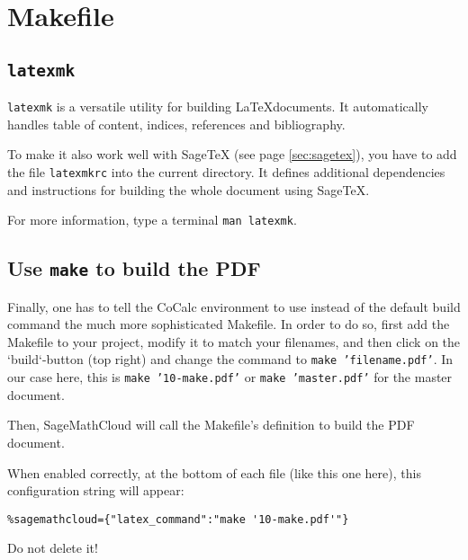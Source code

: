 \documentclass[master.tex]{subfiles}
\begin{document}
\chapter{Makefile}

\section{\texttt{latexmk}}

\texttt{latexmk} is a versatile utility for building \LaTeX documents.
It automatically handles table of content, indices,
references and bibliography.

To make it also work well with SageTeX (see page \ref{sec:sagetex}),
you have to add the file \texttt{latexmkrc}
into the current directory.
It defines additional dependencies and instructions for
building the whole document using SageTeX.

For more information, type a terminal \texttt{man latexmk}.

\section{Use \texttt{make} to build the PDF}

Finally, one has to tell the CoCalc environment to use
instead of the default build command
the much more sophisticated Makefile.
In order to do so,
first add the Makefile to your project,
modify it to match your filenames,
and then click on the `build`-button (top right)
and change the command to \texttt{make 'filename.pdf'}.
In our case here, this is \texttt{make '10-make.pdf'}
or \texttt{make 'master.pdf'} for the master document.

Then, SageMathCloud will call the Makefile's definition to build the PDF document.

When enabled correctly, at the bottom of each file (like this one here),
this configuration string will appear:

\begin{verbatim}
%sagemathcloud={"latex_command":"make '10-make.pdf'"}
\end{verbatim}

Do not delete it!
\end{document}
